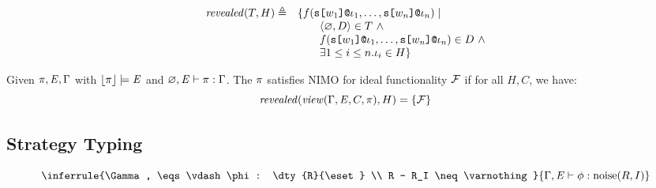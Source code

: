 \begin{definition}[Revelation]
  $$
  \begin{array}{ll}
    \mathit{revealed}(T,H) \triangleq & \{ f(\texttt{s[}w_1\texttt{]}\texttt{@}\iota_1,\ldots,\texttt{s[}w_n\texttt{]}\texttt{@}\iota_n) \mid  \\
      & \qquad \langle \varnothing, D \rangle \in T\ \wedge\\
      & \qquad f(\texttt{s[}w_1\texttt{]}\texttt{@}\iota_1,\ldots,\texttt{s[}w_n\texttt{]}\texttt{@}\iota_n) \in D\ \wedge \\
      & \qquad \exists 1 \le i \le n . \iota_i \in H \} 
  \end{array}
  $$
\end{definition}

\begin{theorem}
  Given $\pi, \mathit{E}, \Gamma$ with $\lfloor \pi \rfloor \models \mathit{E}$ and $\varnothing, \mathit{E} \vdash \pi : \Gamma$.
  The $\pi$ satisfies {NIMO} for ideal functionality $\mathcal{F}$ if for all $H,C$, we have:
  $$
  \mathit{revealed}(\mathit{view}(\Gamma,\mathit{E},C,\pi),H) = \{ \mathcal{F} \}
  $$
\end{theorem}

\subsection{Strategy Typing}

$$
\inferrule
    {\Gamma, \eqs \vdash \phi : \dty{R}{\eset} \\ R - R_I \neq \varnothing}
    {\Gamma, \eqs \vdash \phi : \noise(R,I)}
$$


